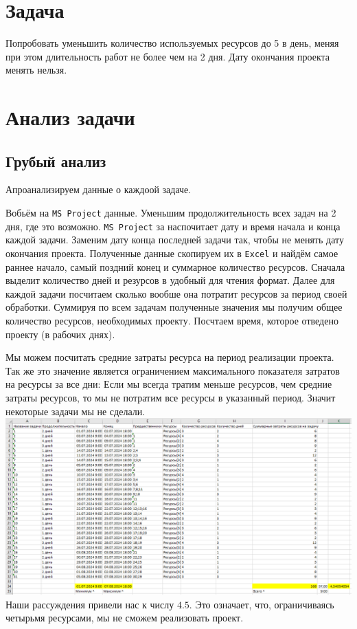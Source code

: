 \documentclass[14pt]{article}
\begin{document}
\section{Задача}
	Попробовать уменьшить количество используемых ресурсов до 5 в день, меняя при этом длительность работ не более чем на 2 дня.
	Дату окончания проекта менять нельзя.
\section{Анализ задачи}
	\subsection{Грубый анализ}
		Апроанализируем данные о каждоой задаче.
		
		Вобьём на \texttt{MS Project} данные.
		Уменьшим продолжительность всех задач на 2 дня, где это возможно.
		\texttt{MS Project} за наспочитает дату и время начала и конца каждой задачи.
		Заменим дату конца последней задачи так, чтобы не менять дату окончания проекта.
		Полученные данные скопируем их в \texttt{Excel} и найдём самое раннее начало,
			самый поздний конец и суммарное количество ресурсов.
		Сначала выделит количество дней и резурсов в удобный для чтения формат.
		Далее для каждой задачи посчитаем сколько вообше она потратит ресурсов за период своей обработки.
		Суммируя по всем задачам полученные значения мы получим общее количество ресурсов, необходимых проекту.
		Посчтаем время, которое отведено проекту (в рабочих днях).
		
		Мы можем посчитать средние затраты ресурса на период реализации проекта.
		Так же это значение является ограничением максимального показателя затратов на ресурсы за все дни:
		Если мы всегда тратим меньше ресурсов, чем средние затраты ресурсов, то мы не потратим все ресурсы в указанный период.
		Значит некоторые задачи мы не сделали.\\
		\includegraphics[width=\textwidth]{../img/1a1_time_estimation.png}\\
		Наши рассуждения привели нас к числу $4.5$.
		Это означает, что, ограничиваясь четырьмя ресурсами, мы не сможем реализовать проект.
\end{document}
